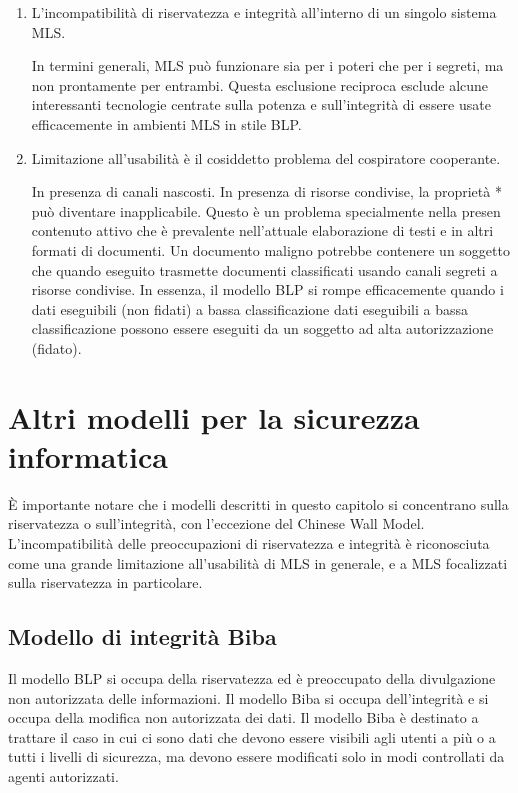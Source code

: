 \begin{enumerate}
    \item L'incompatibilità di riservatezza e integrità all'interno di un singolo sistema MLS. 
    
    In termini generali, MLS può funzionare sia per i poteri che per i segreti, ma non prontamente per entrambi. Questa esclusione reciproca esclude alcune interessanti tecnologie centrate sulla potenza e sull'integrità di essere usate efficacemente in ambienti MLS in stile BLP.
    
    \item Limitazione all'usabilità è il cosiddetto problema del cospiratore cooperante.
    
    In presenza di canali nascosti. In presenza di risorse condivise, la proprietà * può diventare inapplicabile. Questo è un problema specialmente nella presen contenuto attivo che è prevalente nell'attuale elaborazione di testi e in altri formati di documenti. Un documento maligno potrebbe contenere un soggetto che quando eseguito trasmette documenti classificati usando canali segreti a risorse condivise. In essenza, il modello BLP si rompe efficacemente quando i dati eseguibili (non fidati) a bassa classificazione dati eseguibili a bassa classificazione possono essere eseguiti da un soggetto ad alta autorizzazione (fidato).
\end{enumerate}

\newpage
\section{Altri modelli per la sicurezza informatica}
È importante notare che i modelli descritti in questo capitolo si concentrano sulla riservatezza o sull'integrità, con l'eccezione del Chinese Wall Model. L'incompatibilità delle preoccupazioni di riservatezza e integrità è riconosciuta come una grande limitazione all'usabilità di MLS in generale, e a MLS focalizzati sulla riservatezza in particolare.

\subsection{Modello di integrità Biba}

Il modello BLP si occupa della riservatezza ed è preoccupato della divulgazione non autorizzata delle informazioni. Il modello Biba si occupa dell'integrità e si occupa della modifica non autorizzata dei dati. Il modello Biba è destinato a trattare il caso in cui ci sono dati che devono essere visibili agli utenti a più o a tutti i livelli di sicurezza, ma devono essere modificati solo in modi controllati da agenti autorizzati.

